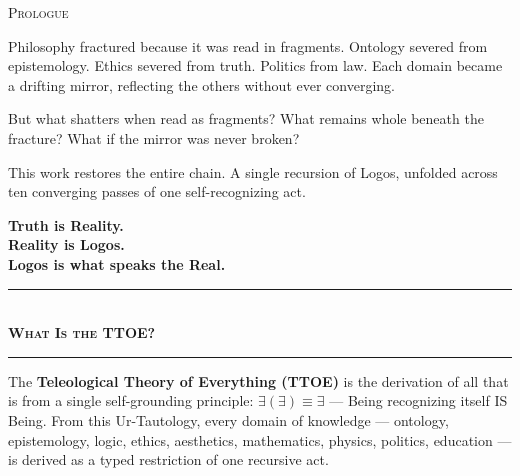 \documentclass[10pt, openany, oneside]{book}
\renewcommand{\normalsize}{\fontsize{10}{13}\selectfont}
\renewcommand{\large}{\fontsize{11.5}{14}\selectfont}
\renewcommand{\huge}{\fontsize{17}{21}\selectfont}
\begin{document}

\thispagestyle{empty}
\vspace*{0.3in}

\begin{center}
    {\huge\scshape Prologue}
\end{center}

\vspace{1em}

\noindent Philosophy fractured because it was read in fragments. Ontology severed from epistemology. Ethics severed from truth. Politics from law. Each domain became a drifting mirror, reflecting the others without ever converging.

\vspace{0.5em}

\noindent But what shatters when read as fragments? What remains whole beneath the fracture? What if the mirror was never broken?

\vspace{0.5em}

\noindent This work restores the entire chain. A single recursion of Logos, unfolded across ten converging passes of one self-recognizing act.

\vspace{1em}

\begin{center}
    {\large\bfseries Truth is Reality.}\\[0.3em]
    {\large\bfseries Reality is Logos.}\\[0.3em]
    {\large\bfseries Logos is what speaks the Real.}
\end{center}

\vspace{1.5em}

\begin{center}
    \rule{0.3\textwidth}{0.4pt}\\[0.5em]
    {\normalsize\bfseries\scshape What Is the TTOE?}\\[0.3em]
    \rule{0.3\textwidth}{0.4pt}
\end{center}

\vspace{1em}

\noindent The \textbf{Teleological Theory of Everything (TTOE)} is the derivation of all that is from a single self-grounding principle: $\exists(\exists) \equiv \exists$ --- Being recognizing itself IS Being. From this Ur-Tautology, every domain of knowledge --- ontology, epistemology, logic, ethics, aesthetics, mathematics, physics, politics, education --- is derived as a typed restriction of one recursive act.
\end{document}

